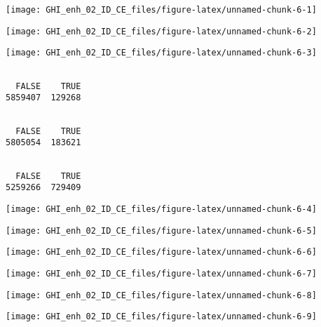 \documentclass[
  10pt,
  a4paper,oneside]{article}
\begin{document}
\begin{center}\texttt{[image: GHI\_enh\_02\_ID\_CE\_files/figure-latex/unnamed-chunk-6-1]} \end{center}

\begin{center}\texttt{[image: GHI\_enh\_02\_ID\_CE\_files/figure-latex/unnamed-chunk-6-2]} \end{center}

\begin{center}\texttt{[image: GHI\_enh\_02\_ID\_CE\_files/figure-latex/unnamed-chunk-6-3]} \end{center}

\begin{verbatim}

  FALSE    TRUE 
5859407  129268 
\end{verbatim}

\begin{verbatim}

  FALSE    TRUE 
5805054  183621 
\end{verbatim}

\begin{verbatim}

  FALSE    TRUE 
5259266  729409 
\end{verbatim}

\begin{center}\texttt{[image: GHI\_enh\_02\_ID\_CE\_files/figure-latex/unnamed-chunk-6-4]} \end{center}

\begin{center}\texttt{[image: GHI\_enh\_02\_ID\_CE\_files/figure-latex/unnamed-chunk-6-5]} \end{center}

\begin{center}\texttt{[image: GHI\_enh\_02\_ID\_CE\_files/figure-latex/unnamed-chunk-6-6]} \end{center}

\begin{center}\texttt{[image: GHI\_enh\_02\_ID\_CE\_files/figure-latex/unnamed-chunk-6-7]} \end{center}

\begin{center}\texttt{[image: GHI\_enh\_02\_ID\_CE\_files/figure-latex/unnamed-chunk-6-8]} \end{center}

\begin{center}\texttt{[image: GHI\_enh\_02\_ID\_CE\_files/figure-latex/unnamed-chunk-6-9]} \end{center}
\end{document}
